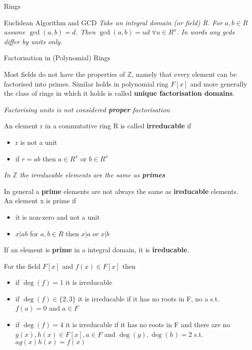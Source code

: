\documentclass[12pt, letterpaper]{article}
\begin{document}
\begin{section}{Rings}
\begin{subsection}{Euclidean Algorithm and GCD}
    \emph{Take an integral domain (or field) R. For \(a, b \in R\) assume \(\gcd(a, b) = d\).
      Then \(\gcd(a, b) = ud \; \forall u \in R^{x}\). In words any gcds differ
      by units only.}

  \end{subsection}

  \begin{subsection}{Factorisation in (Polynomial) Rings}

    Most fields do not have the properties of \(\mathbb{Z}\), namely that every
    element can be factorised into primes. Similar holds in polynomial ring \(F[x]\)
    and more generally the class of rings in which it holds is called
    \textbf{unique factorisation domains}.

    \emph{Factorising units is not considered \textbf{proper} factorisation}

    An element r in a commutative ring R is called \textbf{irreducable} if
    \begin{itemize}
      \item r is not a unit
      \item if \(r = ab\) then \(a \in R^{x}\) or \(b \in R^{x}\)
    \end{itemize}

    \emph{In \(\mathbb{Z}\) the irreducable elements are the same as \textbf{primes}}

    In general a \textbf{prime} elements are not always the same as
    \textbf{ireducable} elements. An element x is prime if
    \begin{itemize}
      \item it is non-zero and not a unit
      \item \(x | ab\) for \(a, b \in R\) then \(x | a \; or \; x | b\)
    \end{itemize}
    If an element is \textbf{prime} in a integral domain, it is \textbf{ireducable}.

    For the field \(F[x]\) and \(f(x) \in F[x]\) then
    \begin{itemize}
      \item if \(\deg(f) = 1\) it is irreducable
      \item if \(\deg(f) \in \{ 2, 3 \}\) it is irreducable if it has no roots
            in F, no a s.t. \(f(a) = 0\) and \(a \in F\)\
      \item if \(\deg(f) = 4\) it is irreducable if it has no roots in F
            and there are no \(g(x), h(x) \in F[x], a \in F\) and \(\deg(g), \deg(h) = 2\)
            s.t.\ \(ag(x)h(x) = f(x)\)
    \end{itemize}


\end{subsection}
\end{section}
\end{document}
